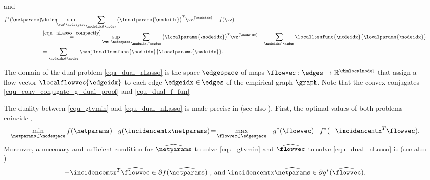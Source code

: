 \documentclass[lettersize,journal]{IEEEtran}
\begin{document}
and
\begin{align}
	\label{equ_dual_f_fun}
	f^{*}(\netparams) & \!\defeq\! \sup_{\vz \in \nodespace} \sum_{\nodeidx \in \nodes} \big( \localparams{\nodeidx} \big)^{T}\vz^{(\nodeidx)}- f(\vz) \nonumber \\  
	& \stackrel{\eqref{equ_nLasso_compactly}}{=} \sup_{\vz \in \nodespace} \sum_{\nodeidx \in \nodes} \big( \localparams{\nodeidx} \big)^{T}\vz^{(\nodeidx)} - \sum_{\nodeidx \in \nodes} \locallossfunc{\nodeidx}{\localparams{\nodeidx}} \nonumber \\ 
	& =\sum_{\nodeidx \in \nodes}  \conjlocallossfunc{\nodeidx}{\localparams{\nodeidx}} .
 \vspace{-3mm}
\end{align}

The domain of the dual problem \eqref{equ_dual_nLasso} is the space $\edgespace$ 
of maps $\flowvec: \edges \rightarrow \mathbb{R}^{\dimlocalmodel}$ that assign a flow 
vector $\localflowvec{\edgeidx}$ to each edge $\edgeidx \in \edges$ of the empirical graph $\graph$. 
Note that the convex conjugates \eqref{equ_conv_conjugate_g_dual_proof} and \eqref{equ_dual_f_fun}

The duality between \eqref{equ_gtvmin} and \eqref{equ_dual_nLasso} is made precise in \cite[Ch.\ 31]{RockafellarBook} 
(see also \cite[Sec. 3.5]{pock_chambolle_2016}). First, the optimal values of both problems coincide \cite[Cor.\ 31.2.1]{RockafellarBook},
\begin{equation}
	\label{equ_equal_primal_dual}
	\min_{\netparams \in \nodespace} \hspace*{0mm} f(\netparams)\!+\!g(\incidencemtx \netparams ) \!=\! \hspace*{0mm}\max_{\flowvec \in \edgespace} -g^{*}(\flowvec)\!-\!f^{*}(-\incidencemtx^{T} \flowvec).
 \vspace{-2mm}
\end{equation}
Moreover, a necessary and sufficient condition for $\widehat{\netparams}$ to solve \eqref{equ_gtvmin}
and $\widehat{\flowvec}$ to solve \eqref{equ_dual_nLasso} is \cite[Thm. 31.3]{RockafellarBook} (see also \cite[Ch. 7]{BertCvxAnalOpt}) 
\begin{equation}
	\label{equ_opt_condition_Rocka_KKT}
	-\incidencemtx^{T} \widehat{\flowvec} \in \partial f(\widehat{\netparams}) \mbox{ , and } \incidencemtx \widehat{\netparams} \in  \partial  g^{*}(\widehat{\flowvec}).
  \vspace{-2mm}
\end{equation}
\end{document}

